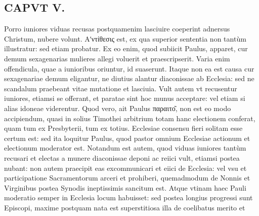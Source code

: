 \documentclass{article}
\begin{document}
\begin{pages}
\section*{CAPVT  V. }
\marginpar{[ p.281 ]} Porro iuniores viduas recusas postquamenim lasciuire coeperint adnersus Christum, nubere volunt.  \pend\pstart Αʹντίθεσις est, ex qua superior sententia non tantùm illustratur: sed etiam probatur. Ex eo enim, quod subiicit Paulus, apparet, cur demum sexagenarias mulieres allegi voluerit et praescripserit. Varia enim offendicula, quae a iunioribus oriuntur, id suaserunt. Itaque non ea est causa cur sexagenariae demum eligantur, ne diutius alantur diaconissae ab Ecclesia: sed ne scandalum praebeant vitae mutatione et lasciuia.  \pend\pstart Vult autem vt recusentur iuniores, etiamsi se offerant, et paratae sint hoc munus acceptare: vel etiam si alias idoneae viderentur. Quod vero, ait Paulus παραιτο͂, non est eo modo accipiendum, quasi in solius Timothei arbitrium totam hanc electionem conferat, quam tum ex Presbyterii, tum ex totius. Ecclesiae consensu fieri solitam esse certum est: sed ita loquitur Paulus, quod pastor omnium Ecclesiae actionum et electionum moderator est. Notandum est autem, quod viduas iuniores tantùm recusari et electas a munere diaconissae deponi ac reiici vult, etiamsi postea nubant: non autem praecipit eas excommunicari et eiici de Ecclesia: vel vsu et participatione Sacramentorum arceri et prohiberi, quemadmodum de Nonnis et Virginibus postea Synodis ineptissimis sancitum est. Atque  vtinam haec Pauli moderatio semper in Ecclesia locum habuisset: sed postea longius progressi sunt Episcopi, maxime postquam nata est superstitiosa illa de coelibatus merito et  \pend

\end{pages}
\end{document}
